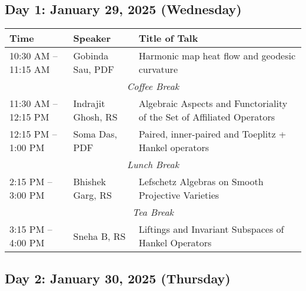 %
%

\subsection*{Day 1: January 29, 2025 (Wednesday)}

\noindent
\renewcommand{\arraystretch}{1.5} %
\begin{tabular}{|p{3.5cm}|p{4cm}|p{7cm}|}
	\hline
	\textbf{Time} & \textbf{Speaker} & \textbf{Title of Talk} \\
	\hline
	10:30 AM -- 11:15 AM & Gobinda Sau, PDF & Harmonic map heat flow and geodesic curvature \\
	\hline
	\multicolumn{3}{|c|}{\textit{Coffee Break}} \\
	\hline
    11:30 AM -- 12:15 PM & Indrajit Ghosh, RS & Algebraic Aspects and Functoriality of the Set of Affiliated Operators \\
	\hline
	12:15 PM -- 1:00 PM & Soma Das, PDF & Paired, inner-paired and Toeplitz + Hankel operators \\
	\hline
	\multicolumn{3}{|c|}{\textit{Lunch Break}} \\
	\hline
	2:15 PM -- 3:00 PM & Bhishek Garg, RS & Lefschetz Algebras on Smooth Projective Varieties \\
	\hline
	\multicolumn{3}{|c|}{\textit{Tea Break}} \\
	\hline
	3:15 PM -- 4:00 PM & Sneha B, RS & Liftings and Invariant Subspaces of Hankel Operators\\
	\hline

\end{tabular}


\subsection*{Day 2: January 30, 2025 (Thursday)}

